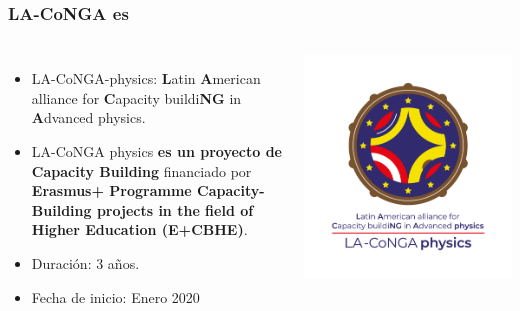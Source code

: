 \begin{frame}[fragile]
\frametitle{LA-CoNGA es}
\begin{columns}[c] %

\begin{itemize}
\item LA-CoNGA-physics: {\bf L}atin {\bf A}merican alliance for {\bf C}apacity buildi{\bf NG} in {\bf A}dvanced physics.
\item LA-CoNGA physics {\bf \color{LCredInst} es un proyecto de Capacity Building} financiado por {\bf \color{LCblueInst} Erasmus+ Programme Capacity-Building projects in the field of Higher Education (E+CBHE)}.
\item Duración: 3 años.
\item Fecha de inicio: Enero 2020
\end{itemize}


\begin{center}
\includegraphics[scale=0.07]{imagenes/imagotipo-vertical-RGB-grande.png}
\end{center}

\end{columns}
\end{frame}

